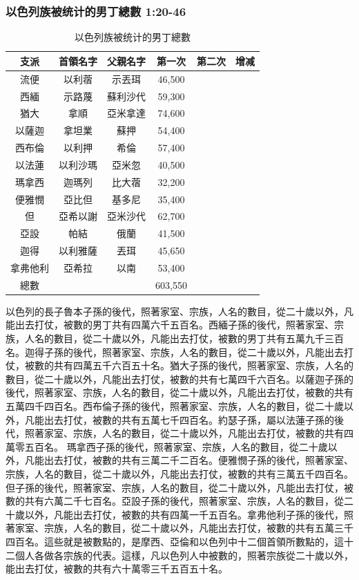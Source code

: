\subsubsection{以色列族被统计的男丁總數 1:20-46}
\begin{table}
\vspace*{-8mm}
\centering
\begin{tabular}{c|c|c|c|c|c}\hline\hline
支派  & 首領名字&  父親名字 &第一次&第二次 &增减\\\hline
流便  &以利蓿 & 示丟珥&46,500 & &\\
西緬  & 示路蔑 &  蘇利沙代&59,300 & & \\
猶大 & 拿順 &亞米拿達&74,600 & &\\
以薩迦 &拿坦業  & 蘇押&54,400 & & \\
西布倫&  以利押& 希倫&57,400 & & \\
以法蓮  &以利沙瑪 & 亞米忽&40,500 & &\\
瑪拿西  & 迦瑪列 &  比大蓿&32,200 & & \\
便雅憫 &亞比但 &基多尼&35,400 && \\
但  &亞希以謝 & 亞米沙代&62,700 && \\
亞設  & 帕結 &  俄蘭&41,500 & & \\
迦得&以利雅薩 & 丟珥&45,650 & & \\
拿弗他利&亞希拉 & 以南&53,400 & & \\\hline
總數&&&603,550&&\\\hline
\end{tabular}
\caption{以色列族被统计的男丁總數}
\end{table}
以色列的長子魯本子孫的後代，照著家室、宗族，人名的數目，從二十歲以外，凡能出去打仗，被數的男丁共有四萬六千五百名。西緬子孫的後代，照著家室、宗族，人名的數目，從二十歲以外，凡能出去打仗，被數的男丁共有五萬九千三百名。迦得子孫的後代，照著家室、宗族，人名的數目，從二十歲以外，凡能出去打仗，被數的共有四萬五千六百五十名。猶大子孫的後代，照著家室、宗族，人名的數目，從二十歲以外，凡能出去打仗，被數的共有七萬四千六百名。以薩迦子孫的後代，照著家室、宗族，人名的數目，從二十歲以外，凡能出去打仗，被數的共有五萬四千四百名。西布倫子孫的後代，照著家室、宗族，人名的數目，從二十歲以外，凡能出去打仗，被數的共有五萬七千四百名。約瑟子孫，屬以法蓮子孫的後代，照著家室、宗族，人名的數目，從二十歲以外，凡能出去打仗，被數的共有四萬零五百名。 瑪拿西子孫的後代，照著家室、宗族，人名的數目，從二十歲以外，凡能出去打仗，被數的共有三萬二千二百名。便雅憫子孫的後代，照著家室、宗族，人名的數目，從二十歲以外，凡能出去打仗，被數的共有三萬五千四百名。但子孫的後代，照著家室、宗族，人名的數目，從二十歲以外，凡能出去打仗，被數的共有六萬二千七百名。亞設子孫的後代，照著家室、宗族，人名的數目，從二十歲以外，凡能出去打仗，被數的共有四萬一千五百名。拿弗他利子孫的後代，照著家室、宗族，人名的數目，從二十歲以外，凡能出去打仗，被數的共有五萬三千四百名。這些就是被數點的，是摩西、亞倫和以色列中十二個首領所數點的，這十二個人各做各宗族的代表。這樣，凡以色列人中被數的，照著宗族從二十歲以外，能出去打仗，被數的共有六十萬零三千五百五十名。

